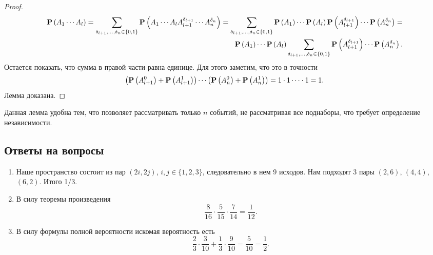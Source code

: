 \documentclass[11 pt,russian]{article}
\begin{document}
\begin{proof}
\begin{eqnarray*}
{\bf P}\left(A_1 \dotsm A_l\right) = \sum_{\delta_{l+1},\dotsc,\delta_n\in \{0,1\}} {\bf P}\left(A_1 \dotsm A_l A_{l+1}^{\delta_{l+1}} \dotsm A_n^{\delta_n}\right) = 
\sum_{\delta_{l+1},\dotsc,\delta_n\in \{0,1\}} {\bf P}\left(A_1\right) \dotsm {\bf P}\left(A_l\right) {\bf P}\left(A_{l+1}^{\delta_{l+1}}\right) \dotsm {\bf P}\left(A_n^{\delta_n}\right) =\\
{\bf P}\left(A_1\right) \dotsm {\bf P}\left(A_l\right) \sum_{\delta_{l+1},\dotsc,\delta_n\in \{0,1\}} {\bf P}\left(A_{l+1}^{\delta_{l+1}}\right) \dotsm {\bf P}\left(A_n^{\delta_n}\right).
\end{eqnarray*} 
Остается показать, что сумма в правой части равна единице. Для этого заметим, что это в точности
$$
\left({\bf P}\left(A_{l+1}^0\right) + {\bf P}\left(A_{l+1}^{1}\right)\right)\dotsm\left({\bf P}\left(A_{n}^0\right) + {\bf P}\left(A_{n}^{1}\right)\right) = 1 \cdot 1 \dotsm \cdot 1 = 1.
$$
Лемма доказана.
\end{proof}
Данная лемма удобна тем, что позволяет рассматривать только $n$ событий, не рассматривая все поднаборы, что требует определение независимости.
\subsection{Ответы на вопросы}
\begin{enumerate}
\item Наше пространство состоит из пар $(2i,2j)$, $i,j\in \{1,2,3\}$, следовательно в нем 9 исходов. Нам подходят 3 пары $(2,6)$, $(4,4)$, $(6,2)$. Итого 1/3.
\item В силу теоремы произведения
$$
\frac{8}{16} \cdot \frac{5}{15} \cdot \frac{7}{14} = \frac{1}{12}.
$$
\item В силу формулы полной вероятности искомая вероятность есть
$$
\frac23 \cdot \frac{3}{10} + \frac13 \cdot \frac{9}{10} = \frac{5}{10} = \frac12.
$$
\end{enumerate}
\end{document}
